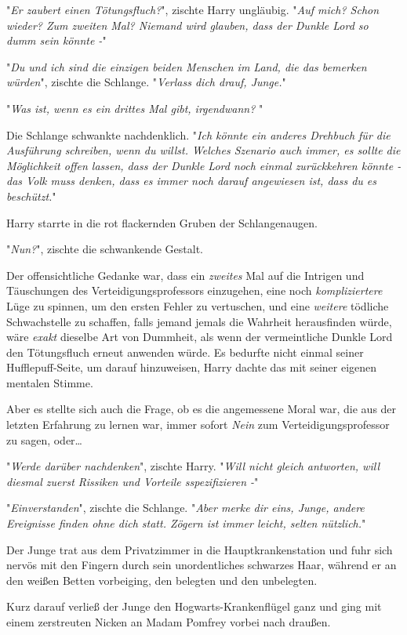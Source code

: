 {"\emph{Er zaubert einen Tötungsfluch?}", zischte Harry ungläubig. "\emph{Auf mich? Schon wieder? Zum zweiten Mal? Niemand wird glauben, dass der Dunkle Lord so dumm sein könnte -}"

"\emph{Du und ich sind die einzigen beiden Menschen im Land, die das bemerken würden}", zischte die Schlange. "\emph{Verlass dich drauf, Junge.}"

"\emph{Was ist, wenn es ein drittes Mal gibt, irgendwann?} "

Die Schlange schwankte nachdenklich. "\emph{Ich könnte ein anderes Drehbuch für die Ausführung schreiben, wenn du willst. Welches Szenario auch immer, es sollte die Möglichkeit offen lassen, dass der Dunkle Lord noch einmal zurückkehren könnte - das Volk muss denken, dass es immer noch darauf angewiesen ist, dass du es beschützt.}"

Harry starrte in die rot flackernden Gruben der Schlangenaugen.

"\emph{Nun?}", zischte die schwankende Gestalt.

Der offensichtliche Gedanke war, dass ein \emph{zweites} Mal auf die Intrigen und Täuschungen des Verteidigungsprofessors einzugehen, eine noch \emph{kompliziertere} Lüge zu spinnen, um den ersten Fehler zu vertuschen, und eine \emph{weitere} tödliche Schwachstelle zu schaffen, falls jemand jemals die Wahrheit herausfinden würde, wäre \emph{exakt} dieselbe Art von Dummheit, als wenn der vermeintliche Dunkle Lord den Tötungsfluch erneut anwenden würde. Es bedurfte nicht einmal seiner Hufflepuff-Seite, um darauf hinzuweisen, Harry dachte das mit seiner eigenen mentalen Stimme.

Aber es stellte sich auch die Frage, ob es die angemessene Moral war, die aus der letzten Erfahrung zu lernen war, immer sofort \emph{Nein} zum Verteidigungsprofessor zu sagen, oder…

"\emph{Werde darüber nachdenken}", zischte Harry. "\emph{Will nicht gleich antworten, will diesmal zuerst Rissiken und Vorteile sspezifizieren -}"

"\emph{Einverstanden}", zischte die Schlange. "\emph{Aber merke dir eins, Junge, andere Ereignisse finden ohne dich statt. Zögern ist immer leicht, selten nützlich.}"

Der Junge trat aus dem Privatzimmer in die Hauptkrankenstation und fuhr sich nervös mit den Fingern durch sein unordentliches schwarzes Haar, während er an den weißen Betten vorbeiging, den belegten und den unbelegten.

Kurz darauf verließ der Junge den Hogwarts-Krankenflügel ganz und ging mit einem zerstreuten Nicken an Madam Pomfrey vorbei nach draußen.

}
